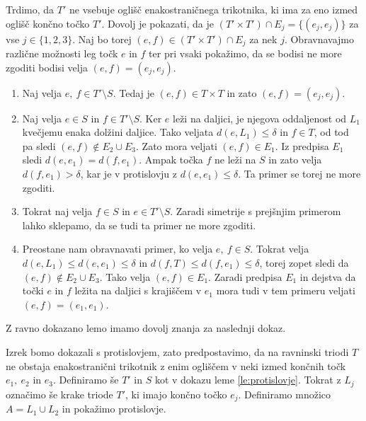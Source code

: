 \documentclass[mat1]{fmfdelo}
\begin{document}
Trdimo, da $T'$ ne vsebuje oglišč enakostraničnega trikotnika, ki ima za eno izmed oglišč končno točko $T'$. Dovolj je pokazati, da je $(T' \times T') \cap E_j = \{(e_j, e_j)\}$ za vse $j \in \{1, 2, 3\}$. Naj bo torej $(e, f) \in (T' \times T') \cap E_j$ za nek $j$. Obravnavajmo različne možnosti leg točk $e$ in $f$ ter pri vsaki pokažimo, da se bodisi ne more zgoditi bodisi velja $(e, f) = (e_j, e_j)$.
\begin{enumerate}
\item Naj velja $e,\ f \in T' \setminus S$. Tedaj je $(e, f) \in T \times T$ in zato $(e, f) = (e_j, e_j)$.
\item Naj velja $e \in S$ in $f \in T' \setminus S$. Ker $e$ leži na daljici, je njegova oddaljenost od $L_1$ kvečjemu enaka dolžini daljice. Tako veljata $d(e, L_1)\leq \delta$ in $f \in T$, od tod pa sledi $(e, f) \notin E_2 \cup E_3$. Zato mora veljati $(e, f) \in E_1$. Iz predpisa $E_1$ sledi $d(e, e_1) = d(f, e_1)$. Ampak točka $f$ ne leži na $S$ in zato velja $d(f, e_1) > \delta$, kar je v protislovju z $d(e, e_1) \leq \delta$. Ta primer se torej ne more zgoditi.
\item Tokrat naj velja $f \in S$ in $e \in T' \setminus S$. Zaradi simetrije s prejšnjim primerom lahko sklepamo, da se tudi ta primer ne more zgoditi.
\item Preostane nam obravnavati primer, ko velja $e,\ f \in S$. Tokrat velja $d(e, L_1) \leq d(e, e_1) \leq \delta$ in $d(f, T) \leq d(f, e_1) \leq \delta$, torej zopet sledi da $(e, f) \notin E_2 \cup E_3$. Tako velja $(e, f) \in E_1$. Zaradi predpisa $E_1$ in dejstva da točki $e$ in $f$ ležita na daljici s krajiščem v $e_1$ mora tudi v tem primeru veljati $(e, f) = (e_1, e_1)$.
\end{enumerate}
\endproof

Z ravno dokazano lemo imamo dovolj znanja za naslednji dokaz.

Izrek bomo dokazali s protislovjem, zato predpostavimo, da na ravninski triodi $T$ ne obstaja enakostranični trikotnik z enim ogliščem v neki izmed končnih točk $e_1,\ e_2$ in $e_3$. Definiramo še $T'$ in $S$ kot v dokazu leme \ref{le:protislovje}. Tokrat z $L_j$ označimo še krake triode $T'$, ki imajo končno točko $e_j$. Definiramo množico $A = L_1 \cup L_2$ in pokažimo protislovje.

\begin{center}
\end{center}
\end{document}
